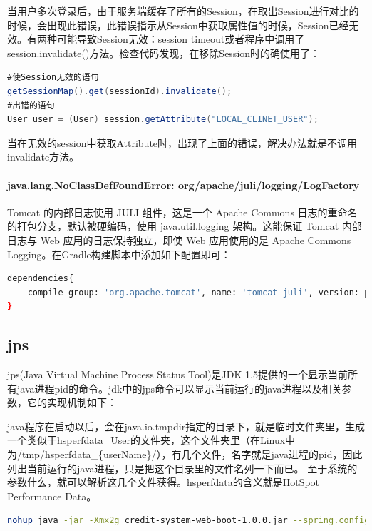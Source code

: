 \documentclass[letter]{book}
\begin{document}
当用户多次登录后，由于服务端缓存了所有的Session，在取出Session进行对比的时候，会出现此错误，此错误指示从Session中获取属性值的时候，Session已经无效。有两种可能导致Session无效：session timeout或者程序中调用了session.invalidate()方法。检查代码发现，在移除Session时的确使用了：

\begin{lstlisting}[language=Java]
#使Session无效的语句
getSessionMap().get(sessionId).invalidate();
#出错的语句
User user = (User) session.getAttribute("LOCAL_CLINET_USER");
\end{lstlisting}

当在无效的session中获取Attribute时，出现了上面的错误，解决办法就是不调用invalidate方法。

\paragraph{java.lang.NoClassDefFoundError: org/apache/juli/logging/LogFactory}

Tomcat 的内部日志使用 JULI 组件，这是一个 Apache Commons 日志的重命名的打包分支，默认被硬编码，使用 java.util.logging 架构。这能保证 Tomcat 内部日志与 Web 应用的日志保持独立，即使 Web 应用使用的是 Apache Commons Logging。在Gradle构建脚本中添加如下配置即可：

\begin{lstlisting}[language=Bash]
dependencies{
	compile group: 'org.apache.tomcat', name: 'tomcat-juli', version: property('tomcat.version')
}
\end{lstlisting}

\subsection{jps}

jps(Java Virtual Machine Process Status Tool)是JDK 1.5提供的一个显示当前所有java进程pid的命令。jdk中的jps命令可以显示当前运行的java进程以及相关参数，它的实现机制如下：

java程序在启动以后，会在java.io.tmpdir指定的目录下，就是临时文件夹里，生成一个类似于hsperfdata\_User的文件夹，这个文件夹里（在Linux中为/tmp/hsperfdata\_\{userName\}/），有几个文件，名字就是java进程的pid，因此列出当前运行的java进程，只是把这个目录里的文件名列一下而已。 至于系统的参数什么，就可以解析这几个文件获得。hsperfdata的含义就是HotSpot Performance Data。

\begin{lstlisting}[language=Bash]
nohup java -jar -Xmx2g credit-system-web-boot-1.0.0.jar --spring.config.location=application-jenkins.properties &
\end{lstlisting}
\end{document}
